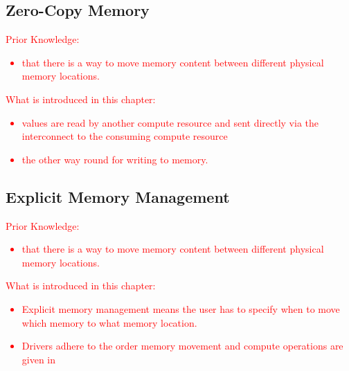 \documentclass[a4paper,10pt]{scrartcl}
\newcommand\gist[1]{\textcolor{red}{#1}}
\begin{document}
\subsection{Zero-Copy Memory}
\gist{
  Prior Knowledge:
\begin{itemize}
\item that there is a way to move memory content between different physical memory locations.
\end{itemize}
  What is introduced in this chapter:
\begin{itemize}
\item values are read by another compute resource and sent directly via the interconnect to the consuming compute resource
\item the other way round for writing to memory.
\end{itemize}
}


\subsection{Explicit Memory Management}
\gist{
  Prior Knowledge:
\begin{itemize}
\item that there is a way to move memory content between different physical memory locations.
\end{itemize}
  What is introduced in this chapter:
\begin{itemize}
\item Explicit memory management means the user has to specify when to move which memory to what memory location.
\item Drivers adhere to the order memory movement and compute operations are given in
\end{itemize}
}
\end{document}
